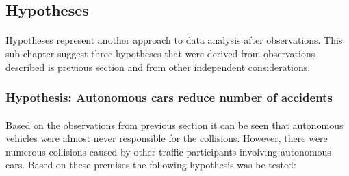 \documentclass[11pt,english]{article}
\begin{document}


















\subsection{Hypotheses}
\paragraph{}

Hypotheses represent another approach to data analysis after observations. This sub-chapter suggest three hypotheses that were derived from observations described is previous section and from other independent considerations.



\subsubsection{Hypothesis: Autonomous cars reduce number of accidents}
\paragraph{}

Based on the observations from previous section it can be seen that autonomous vehicles were almost never responsible for the collisions. However, there were numerous collisions caused by other traffic participants involving autonomous cars. Based on these premises the following hypothesis was be tested:
\end{document}
